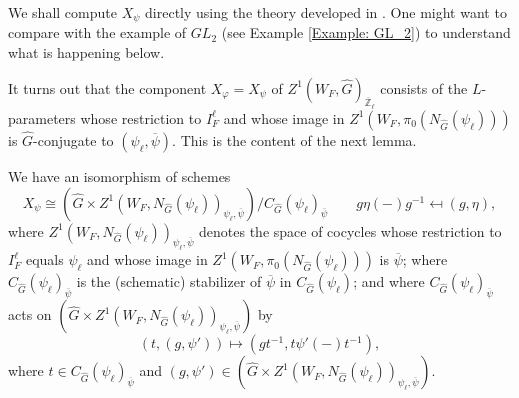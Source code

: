We shall compute $X_{\psi}$ directly using the theory developed in \cite[Section 4]{dat2022ihes}. One might want to compare with the example of $GL_2$ (see Example \ref{Example: GL_2}) to understand what is happening below.

It turns out that the component $X_{\varphi}=X_{\psi}$ of $Z^1(W_F, \hat{G})_{\overline{\mathbb{Z}}_{\ell}}$ consists of the $L$-parameters whose restriction to $I_F^{\ell}$ and whose image in $Z^1(W_F, \pi_0(N_{\hat{G}}(\psi_{\ell})))$ is $\hat{G}$-conjugate to $(\psi_{\ell}, \overline{\psi})$. This is the content of the next lemma.

\begin{lemma}
	We have an isomorphism of schemes
	\begin{equation}\label{Equation: X_psi_dat_4.6}
		X_{\psi} \cong \left(\hat{G} \times Z^1(W_F, N_{\hat{G}}(\psi_{\ell}))_{\psi_{\ell}, \overline{\psi}}\right)/C_{\hat{G}}(\psi_{\ell})_{\overline{\psi}} \qquad g\eta(-)g^{-1} \mapsfrom (g, \eta),
	\end{equation}
	where $Z^1(W_F, N_{\hat{G}}(\psi_{\ell}))_{\psi_{\ell}, \overline{\psi}}$  denotes the space of cocycles whose restriction to $I_F^{\ell}$ equals $\psi_{\ell}$ and whose image in $Z^1(W_F, \pi_0(N_{\hat{G}}(\psi_{\ell})))$ is $\overline{\psi}$; where $C_{\hat{G}}(\psi_{\ell})_{\overline{\psi}}$ is the (schematic) stabilizer of $\overline{\psi}$ in $C_{\hat{G}}(\psi_{\ell})$; and where $C_{\hat{G}}(\psi_{\ell})_{\overline{\psi}}$ acts on $(\hat{G} \times Z^1(W_F, N_{\hat{G}}(\psi_{\ell}))_{\psi_{\ell}, \overline{\psi}})$ by 
	$$(t, (g, \psi')) \mapsto (gt^{-1}, t\psi'(-)t^{-1}),$$
	where $t \in C_{\hat{G}}(\psi_{\ell})_{\overline{\psi}}$ and $(g, \psi') \in (\hat{G} \times Z^1(W_F, N_{\hat{G}}(\psi_{\ell}))_{\psi_{\ell}, \overline{\psi}})$.
\end{lemma}


